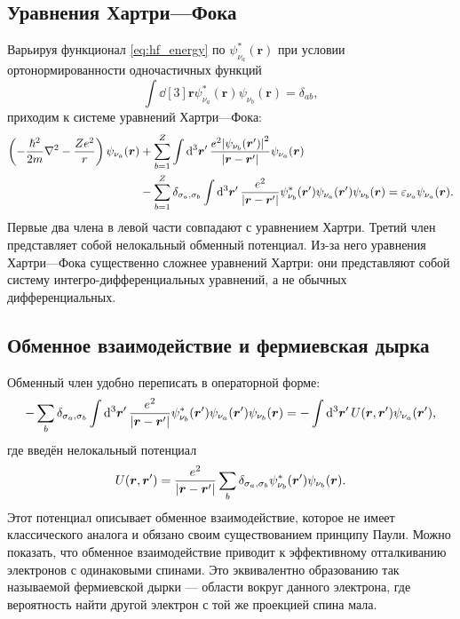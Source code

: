 \documentclass[a4paper, 12pt]{article}
\numberwithin{equation}{section}
\begin{document}
\subsection{Уравнения Хартри---Фока}
\label{subsec:hf_equations}

Варьируя функционал \eqref{eq:hf_energy} по $\psi_{\nu_a}^*(\bm{r})$ при условии ортонормированности одночастичных функций
\begin{equation}
\int \dd[3]{\bm{r}} \psi_{\nu_a}^*(\bm{r}) \psi_{\nu_b}(\bm{r}) = \delta_{ab},
\end{equation}
приходим к системе уравнений Хартри---Фока:
\begin{equation}
\label{eq:hartree_fock_eq}
\begin{split}
\left( -\frac{\hslash^2}{2m} \nabla^2 - \frac{Z e^2}{r} \right) \psi_{\nu_a}(\bm{r}) &+ \sum_{b=1}^{Z} \int \dd[3]{\bm{r}'} \frac{e^2 \abs{\psi_{\nu_b}(\bm{r}')}^2}{\abs{\bm{r} - \bm{r}'}} \psi_{\nu_a}(\bm{r}) \\
&- \sum_{b=1}^{Z} \delta_{\sigma_a, \sigma_b} \int \dd[3]{\bm{r}'} \frac{e^2}{\abs{\bm{r} - \bm{r}'}} \psi_{\nu_b}^*(\bm{r}') \psi_{\nu_a}(\bm{r}') \psi_{\nu_b}(\bm{r}) = \varepsilon_{\nu_a} \psi_{\nu_a}(\bm{r}).
\end{split}
\end{equation}
Первые два члена в левой части совпадают с уравнением Хартри. Третий член представляет собой нелокальный обменный потенциал. Из-за него уравнения Хартри---Фока существенно сложнее уравнений Хартри: они представляют собой систему интегро-дифференциальных уравнений, а не обычных дифференциальных.

\subsection{Обменное взаимодействие и фермиевская дырка}
\label{subsec:exchange_fermi_hole}

Обменный член удобно переписать в операторной форме:
\begin{equation}
\label{eq:exchange_operator}
-\sum_{b} \delta_{\sigma_a, \sigma_b} \int \dd[3]{\bm{r}'} \frac{e^2}{\abs{\bm{r} - \bm{r}'}} \psi_{\nu_b}^*(\bm{r}') \psi_{\nu_a}(\bm{r}') \psi_{\nu_b}(\bm{r}) = -\int \dd[3]{\bm{r}'} U(\bm{r}, \bm{r}') \psi_{\nu_a}(\bm{r}'),
\end{equation}
где введён нелокальный потенциал
\begin{equation}
\label{eq:nonlocal_potential}
U(\bm{r}, \bm{r}') = \frac{e^2}{\abs{\bm{r} - \bm{r}'}} \sum_{b} \delta_{\sigma_a, \sigma_b} \psi_{\nu_b}^*(\bm{r}') \psi_{\nu_b}(\bm{r}).
\end{equation}
Этот потенциал описывает обменное взаимодействие, которое не имеет классического аналога и обязано своим существованием принципу Паули. Можно показать, что обменное взаимодействие приводит к эффективному отталкиванию электронов с одинаковыми спинами. Это эквивалентно образованию так называемой фермиевской дырки --- области вокруг данного электрона, где вероятность найти другой электрон с той же проекцией спина мала.
\end{document}
